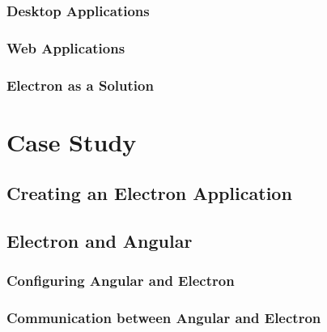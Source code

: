 \documentclass[11pt]{article}
\begin{document}
    \subsubsection{Desktop Applications}\label{subsubsec:desktop-applications}
    

    \subsubsection{Web Applications}\label{subsubsec:web-applications}
    

    \subsubsection{Electron as a Solution}\label{subsubsec:electron-as-solution}
    
    \clearpage

    \section{Case Study}\label{sec:method}
    
    
    
    

    \subsection{Creating an Electron Application}\label{subsec:developing-with-electron-creation}
    

    \subsection{Electron and Angular}\label{subsec:developing-with-electron-angular}
    

    \subsubsection{Configuring Angular and Electron}\label{subsubsec:developing-with-electron-angular-config}
    

    \subsubsection{Communication between Angular and Electron}\label{subsubsec:developing-with-electron-angular-communication}
    
    \clearpage
\end{document}
